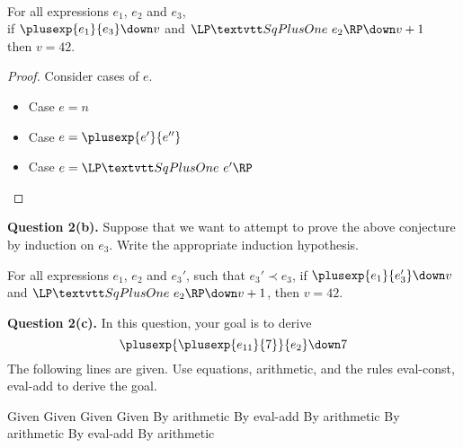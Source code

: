 \begin{conjecture*} ~\\
  For all expressions $e_1$, $e_2$ and $e_3$, \\
  if $\plusexp{e_1}{e_3} \down v$ and $\sqplusoneexp{e_2} \down v + 1$ \\
  then $v = 42$.
\end{conjecture*}
\begin{proof}
  Consider cases of $e$.

  \begin{itemize}
  \item Case $e = n$
  \item Case $e = \plusexp{e'}{e''}$
  \item Case $e = \sqplusoneexp{e'}$
  \end{itemize}

\vspace*{10ex}
\end{proof}


\textbf{Question 2(b).}
Suppose that we want to attempt to prove the above conjecture by induction on $e_3$.
Write the appropriate induction hypothesis.
\vspace*{1.2ex}

For all expressions $e_1$, $e_2$ and $e_3'$, such that $e_3'\prec e_3$, if $\plusexp{e_1}{e_3'} \down v$ and $\sqplusoneexp{e_2} \down v + 1$, then $v = 42$.

\vspace*{10ex}

\textbf{Question 2(c).}
In this question, your goal is to derive
\[
  \plusexp{\plusexp{e_{11}}{7}}{e_2} \down 7
\]
The following lines are given.  Use equations, arithmetic,
and the rules eval-const, eval-add to derive the goal.

\begin{llproof}
    {Given}
    {Given}
    {Given}
    {Given}
    {By arithmetic}
    {By eval-add}
    {By arithmetic}
    {By arithmetic}
    {By eval-add}
    {By arithmetic}
  \Pf{}{}{\hspace*{150pt}}  {}
\end{llproof}

\vspace*{20ex}



